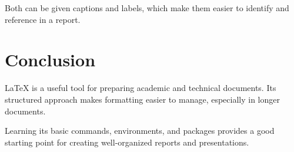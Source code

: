 \documentclass[12pt,a4paper]{report}
\begin{document}
	Both can be given captions and labels, which make
	them easier to identify and reference in a report.
	
	\chapter{Conclusion}
	
	LaTeX is a useful tool for preparing academic and
	technical documents. Its structured approach makes
	formatting easier to manage, especially in longer
	documents.
	
	Learning its basic commands, environments, and
	packages provides a good starting point for creating
	well-organized reports and presentations.
	
\end{document}
